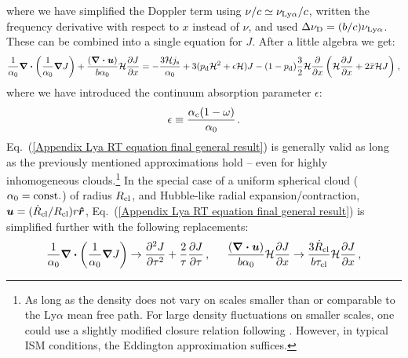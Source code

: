 \documentclass[fleqn,usenatbib]{mnras}
\newcommand{\taucl}{\tau_{\rm cl}}
\begin{document}
where we have simplified the Doppler term using $\nu/c \simeq \nu_{\rm Ly\alpha}/c$, written the frequency derivative with respect to $x$ instead of $\nu$, and used $\Delta \nu_{\rm D} = (b/c) \nu_{\rm Ly \alpha}$. These can be combined into a single equation for $J$. After a little algebra we get:
\begin{equation}
     \dfrac{1}{\alpha_0} \boldsymbol{\nabla} \boldsymbol{\cdot} \left( \dfrac{1}{\alpha_0}  \boldsymbol{\nabla} J  \right) + \dfrac{(\boldsymbol{\nabla \cdot u})}{b \alpha_0 } \mathcal{H} \dfrac{\partial J}{\partial x} = - \dfrac{3 \mathcal{H} j_{\rm s}}{\alpha_0} + 3 (p_{\rm d} \mathcal{H}^2 + \epsilon \mathcal{H}) J - (1 - p_{\rm d})  \dfrac{3}{2} \mathcal{H} \dfrac{\partial}{\partial x} \left(  \mathcal{H} \dfrac{\partial J}{\partial x} +  2 \Bar{x} \mathcal{H} J \right)  \hspace{1 pt} \label{Appendix Lya RT equation final general result},
\end{equation}
where we have introduced the continuum absorption parameter $\epsilon$:
\begin{equation}
    \epsilon \equiv \dfrac{\alpha_{\rm c}(1-\omega)}{\alpha_0} \hspace{1 pt} .
\end{equation}
Eq.~(\ref{Appendix Lya RT equation final general result}) is generally valid as long as the previously mentioned approximations hold -- even for highly inhomogeneous clouds.\footnote{As long as the density does not vary on scales smaller than or comparable to the Ly$\alpha$ mean free path. For large density fluctuations on smaller scales, one could use a slightly modified closure relation following \cite{Begelman2006}. However, in typical ISM conditions, the Eddington approximation suffices. } In the special case of a uniform spherical cloud ($\alpha_0 = \rm const.$) of radius $R_{\rm cl}$, and Hubble-like radial expansion/contraction, $\boldsymbol{u} = (\Dot{R}_{\rm cl}/R_{\rm cl})r \boldsymbol{\hat{r}}$, Eq.~(\ref{Appendix Lya RT equation final general result}) is simplified further with the following replacements:
\begin{equation}
    \dfrac{1}{\alpha_0} \boldsymbol{\nabla} \boldsymbol{\cdot} \left( \dfrac{1}{\alpha_0}  \boldsymbol{\nabla} J  \right) \rightarrow \dfrac{\partial ^2 J}{\partial \tau^2} + \dfrac{2}{\tau} \dfrac{\partial J}{\partial \tau} \, , \hspace{15 pt} \dfrac{(\boldsymbol{\nabla \cdot u})}{b \alpha_0 } \mathcal{H} \dfrac{\partial J}{\partial x} \rightarrow \dfrac{3\Dot{R}_{\rm cl}}{b \taucl } \mathcal{H} \dfrac{\partial J}{\partial x} \, ,  
\end{equation}
\end{document}
